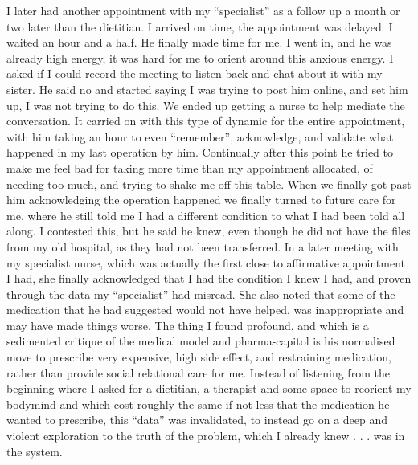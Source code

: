 I later had another appointment with my ``specialist'' as a follow up a
month or two later than the dietitian. I arrived on time, the
appointment was delayed. I waited an hour and a half. He finally made
time for me. I went in, and he was already high energy, it was hard for
me to orient around this anxious energy. I asked if I could record the
meeting to listen back and chat about it with my sister. He said no and
started saying I was trying to post him online, and set him up, I was
not trying to do this. We ended up getting a nurse to help mediate the
conversation. It carried on with this type of dynamic for the entire
appointment, with him taking an hour to even ``remember'', acknowledge,
and validate what happened in my last operation by him. Continually
after this point he tried to make me feel bad for taking more time than
my appointment allocated, of needing too much, and trying to shake me
off this table. When we finally got past him acknowledging the operation
happened we finally turned to future care for me, where he still told me
I had a different condition to what I had been told all along. I
contested this, but he said he knew, even though he did not have the
files from my old hospital, as they had not been transferred. In a later
meeting with my specialist nurse, which was actually the first close to
affirmative appointment I had, she finally acknowledged that I had the
condition I knew I had, and proven through the data my ``specialist''
had misread. She also noted that some of the medication that he had
suggested would not have helped, was inappropriate and may have made
things worse. The thing I found profound, and which is a sedimented
critique of the medical model and pharma-capitol is his normalised move
to prescribe very expensive, high side effect, and restraining
medication, rather than provide social relational care for me. Instead
of listening from the beginning where I asked for a dietitian, a
therapist and some space to reorient my bodymind and which cost roughly
the same if not less that the medication he wanted to prescribe, this
``data'' was invalidated, to instead go on a deep and violent
exploration to the truth of the problem, which I already knew . . . was
in the system.

